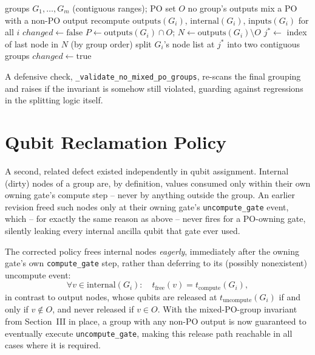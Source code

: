 \documentclass[conference]{IEEEtran}
\begin{document}
\begin{algorithm}
\caption{Mixed-PO group splitting (fixed point)}
\label{alg:splitmixed}
\begin{algorithmic}[1]
\Require groups $G_1,\dots,G_m$ (contiguous ranges); PO set $O$
\Ensure no group's outputs mix a PO with a non-PO output
\Repeat
  \State recompute $\mathrm{outputs}(G_i)$, $\mathrm{internal}(G_i)$, $\mathrm{inputs}(G_i)$ for all $i$
  \State $changed \gets \mathrm{false}$
    \State $P \gets \mathrm{outputs}(G_i)\cap O$; \quad $N \gets \mathrm{outputs}(G_i)\setminus O$
      \State $j^\ast \gets$ index of last node in $N$ (by group order)
      \State split $G_i$'s node list at $j^\ast$ into two contiguous groups
      \State $changed \gets \mathrm{true}$
    \EndIf
  \EndFor
{}
\end{algorithmic}
\end{algorithm}

A defensive check, \texttt{\_validate\_no\_mixed\_po\_groups}, re-scans
the final grouping and raises if the invariant is somehow still
violated, guarding against regressions in the splitting logic itself.

\section{Qubit Reclamation Policy}

A second, related defect existed independently in qubit assignment.
Internal (dirty) nodes of a group are, by definition, values consumed
only within their own owning gate's compute step -- never by anything
outside the group. An earlier revision freed such nodes only at their
owning gate's \texttt{uncompute\_gate} event, which -- for exactly the
same reason as above -- never fires for a PO-owning gate, silently
leaking every internal ancilla qubit that gate ever used.

The corrected policy frees internal nodes \emph{eagerly}, immediately
after the owning gate's own \texttt{compute\_gate} step, rather than
deferring to its (possibly nonexistent) uncompute event:
\begin{equation}
\forall v \in \mathrm{internal}(G_i):\quad
t_{\mathrm{free}}(v) = t_{\mathrm{compute}}(G_i),
\end{equation}
in contrast to output nodes, whose qubits are released at
$t_{\mathrm{uncompute}}(G_i)$ if and only if $v\notin O$, and never
released if $v\in O$. With the mixed-PO-group invariant from
Section~III in place, a group with any non-PO output is now guaranteed
to eventually execute \texttt{uncompute\_gate}, making this release
path reachable in all cases where it is required.
\end{document}
